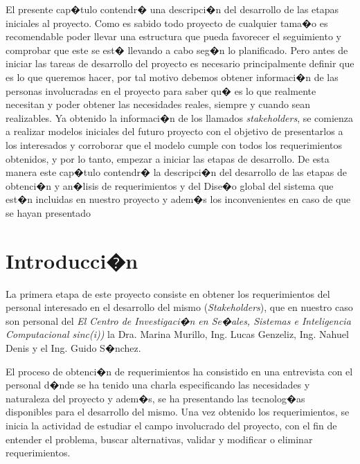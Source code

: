 \begin{resumen}
	El presente cap�tulo contendr� una descripci�n del desarrollo de las etapas iniciales al proyecto. Como es sabido todo proyecto de cualquier tama�o es recomendable poder llevar una estructura que pueda favorecer el seguimiento y comprobar que este se est� llevando a cabo seg�n lo  planificado. Pero antes de iniciar las tareas de desarrollo del proyecto es necesario principalmente definir que es lo que queremos hacer, por tal motivo debemos obtener informaci�n de las personas involucradas en el proyecto para saber qu� es lo que realmente necesitan y poder obtener las necesidades reales, siempre y cuando sean realizables. Ya obtenido la informaci�n de los llamados \textit{stakeholders}, se comienza a realizar modelos iniciales del futuro proyecto con el objetivo de presentarlos a los interesados y corroborar que el modelo  cumple con todos los requerimientos obtenidos, y por lo tanto, empezar a iniciar las etapas de desarrollo.
	De esta manera este cap�tulo contendr� la descripci�n del desarrollo de las etapas de obtenci�n y an�lisis de requerimientos y del Dise�o global del sistema que est�n incluidas en nuestro proyecto y adem�s los inconvenientes  en caso de que se hayan presentado
\end{resumen}

\newpage
\section{Introducci�n}
\label{cap1:sec:introduccion}


	La primera etapa de este proyecto consiste en obtener los requerimientos del personal interesado en el desarrollo del mismo (\textit{Stakeholders}), que en nuestro caso son personal del \textit{El Centro de Investigaci�n en Se�ales, Sistemas e Inteligencia Computacional sinc(i))} la Dra. Marina Murillo, Ing. Lucas Genzeliz, Ing. Nahuel Denis y el Ing. Guido S�nchez.
	
	El proceso de obtenci�n de requerimientos ha consistido en una entrevista con el  personal d�nde se ha tenido una charla especificando las necesidades y naturaleza del proyecto y adem�s, se ha presentando las tecnolog�as disponibles para el desarrollo del mismo. Una vez obtenido los requerimientos, se inicia la actividad de estudiar el campo involucrado del proyecto, con el fin de entender el problema, buscar alternativas, validar y modificar o eliminar requerimientos.
	
